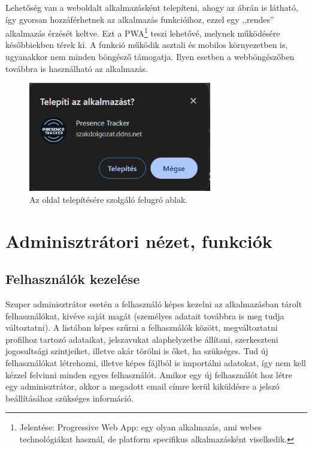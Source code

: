 \documentclass[
]{thesis-ekf}
\theoremstyle{definition}
\theoremstyle{remark}
\begin{document}
Lehetőség van a weboldalt alkalmazásként telepíteni, ahogy az  ábrán is látható, így gyorsan hozzáférhetnek az alkalmazás funkcióihoz, ezzel egy ,,rendes'' alkalmazás érzését keltve. Ezt a PWA\footnote{Jelentése: Progressive Web App: egy olyan alkalmazás, ami webes technológiákat használ, de platform specifikus alkalmazásként viselkedik.\cite{PWA}} teszi lehetővé, melynek működésére későbbiekben térek ki. A funkció működik asztali és mobilos környezetben is, ugyanakkor nem minden böngésző támogatja. Ilyen esetben a webböngészőben továbbra is használható az alkalmazás.

\begin{figure}[ht!]
	\centering
	\includegraphics[width=8cm]{../pictures/screenshots/install.png}
	\caption{Az oldal telepítésére szolgáló felugró ablak.}
	\label{install}
\end{figure}

\section{Adminisztrátori nézet, funkciók}

\subsection{Felhasználók kezelése}

Szuper adminisztrátor esetén a felhasználó képes kezelni az alkalmazásban tárolt felhasználókat, kivéve saját magát (személyes adatait továbbra is meg tudja változtatni). A listában képes szűrni a felhasználók között, megváltoztatni profilhoz tartozó adataikat, jelszavukat alaphelyzetbe állítani, szerkeszteni jogosultsági szintjeiket, illetve akár törölni is őket, ha szükséges. Tud új felhasználókat létrehozni, illetve képes fájlból is importálni adatokat, így nem kell kézzel felvinni minden egyes felhasználót. Amikor egy új felhasználót hoz létre egy adminisztrátor, akkor a megadott email címre kerül kiküldésre a jelszó beállításához szükséges információ.
\end{document}
